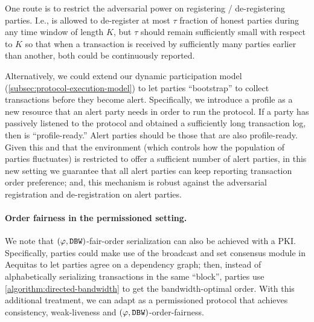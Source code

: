 One route is to restrict the adversarial power on registering / de-registering parties.
%
I.e., \adv is allowed to de-register at most $\tau$ fraction of honest parties during any time window of length $K$, but $\tau$ should remain sufficiently small with respect to $K$ so that when a transaction is received by sufficiently many parties earlier than another, both could be continuously reported.

Alternatively, we could extend our dynamic participation model (\cref{subsec:protocol-execution-model}) to let parties ``bootstrap'' to collect transactions before they become alert.
%
Specifically, we introduce a profile as a new resource that an alert party needs in order to run the protocol.
%
If a party \party has passively listened to the protocol and obtained a sufficiently long transaction log, then \party is ``profile-ready.''
%
Alert parties should be those that are also profile-ready.
%
Given this and that the environment (which controls how the population of parties fluctuates) is restricted to offer a sufficient number of alert parties, in this new setting we guarantee that all alert parties can keep reporting transaction order preference; and, this mechanism is robust against the adversarial registration and de-registration on alert parties.

\paragraph{Order fairness in the permissioned setting.}
%
We note that $(\varphi, \mathtt{DBW})$-fair-order serialization can also be achieved with a PKI.
%
Specifically, parties could make use of the broadcast and set consensus module in \textsf{Aequitas} \cite{C:KZGJ20} to let parties agree on a dependency graph; then, instead of alphabetically serializing transactions in the same ``block'', parties use \cref{algorithm:directed-bandwidth} to get the bandwidth-optimal order.
%
With this additional treatment, we can adapt \Taxis as a permissioned protocol that achieves consistency, weak-liveness and $(\varphi, \mathtt{DBW})$-order-fairness.
